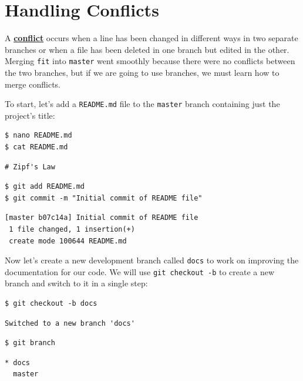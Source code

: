 \documentclass[
]{krantz}
\newcommand{\gref}[2]{\hyperlink{#2}{\textbf{#1}}}
\begin{document}
\hypertarget{git-advanced-conflict}{%
\section{Handling Conflicts}\label{git-advanced-conflict}}

A \gref{conflict}{git\_conflict} occurs
when a line has been changed in different ways in two separate branches
or when a file has been deleted in one branch but edited in the other.
Merging \texttt{fit} into \texttt{master} went smoothly
because there were no conflicts between the two branches,
but if we are going to use branches,
we must learn how to merge conflicts.

To start,
let's add a \texttt{README.md} file to the \texttt{master} branch
containing just the project's title:

\begin{verbatim}
$ nano README.md
$ cat README.md
\end{verbatim}

\begin{verbatim}
# Zipf's Law
\end{verbatim}

\begin{verbatim}
$ git add README.md
$ git commit -m "Initial commit of README file"
\end{verbatim}

\begin{verbatim}
[master b07c14a] Initial commit of README file
 1 file changed, 1 insertion(+)
 create mode 100644 README.md
\end{verbatim}

Now let's create a new development branch called \texttt{docs}
to work on improving the documentation for our code.
We will use \texttt{git\ checkout\ -b} to create a new branch and switch to it
in a single step:

\begin{verbatim}
$ git checkout -b docs
\end{verbatim}

\begin{verbatim}
Switched to a new branch 'docs'
\end{verbatim}

\begin{verbatim}
$ git branch
\end{verbatim}

\begin{verbatim}
* docs
  master
\end{verbatim}
\end{document}
